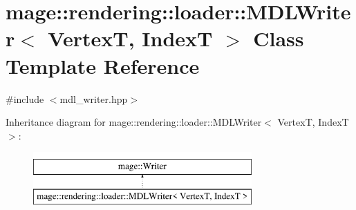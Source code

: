 \hypertarget{classmage_1_1rendering_1_1loader_1_1_m_d_l_writer}{}\section{mage\+:\+:rendering\+:\+:loader\+:\+:M\+D\+L\+Writer$<$ VertexT, IndexT $>$ Class Template Reference}
\label{classmage_1_1rendering_1_1loader_1_1_m_d_l_writer}


{\ttfamily \#include $<$mdl\+\_\+writer.\+hpp$>$}

Inheritance diagram for mage\+:\+:rendering\+:\+:loader\+:\+:M\+D\+L\+Writer$<$ VertexT, IndexT $>$\+:\begin{figure}[H]
\begin{center}
\leavevmode
\includegraphics[height=2.000000cm]{classmage_1_1rendering_1_1loader_1_1_m_d_l_writer}
\end{center}
\end{figure}
